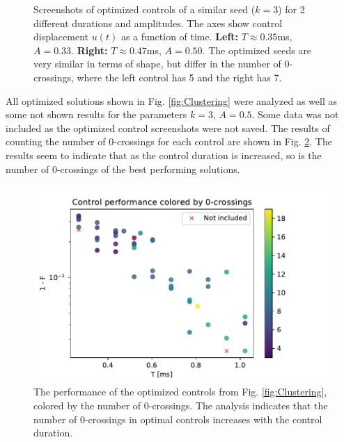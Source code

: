 \documentclass[a4paper, twocolumn]{revtex4-1}
\begin{document}
\begin{figure}
\begin{subfigure}{0.4\columnwidth}
	\end{subfigure}
	\caption{Screenshots of optimized controls of a similar seed ($k=3$) for 2 different durations and amplitudes. The axes show control displacement $u(t)$ as a function of time. \textbf{Left:} $T\approx 0.35$ms, $A=0.33$. \textbf{Right:} $T\approx 0.47$ms, $A=0.50$. The optimized seeds are very similar in terms of shape, but differ in the number of 0-crossings, where the left control has 5 and the right has 7.}
	\label{fig:SimilarTimescales}
\end{figure}

All optimized solutions shown in Fig. \ref{fig:Clustering} were analyzed as well as some not shown results for the parameters $k=3$, $A=0.5$. Some data was not included as the optimized control screenshots were not saved. The results of counting the number of 0-crossings for each control are shown in Fig. \ref{fig:crossingsClustering}. The results seem to indicate that as the control duration is increased, so is the number of 0-crossings of the best performing solutions.  

\begin{figure}
	\includegraphics[width=\columnwidth]{graphics/clustering/crossings.pdf}
	\caption{The performance of the optimized controls from Fig. \ref{fig:Clustering}, colored by the number of 0-crossings. The analysis indicates that the number of 0-crossings in optimal controls increases with the control duration.}
	\label{fig:crossingsClustering}
\end{figure}
\end{document}
